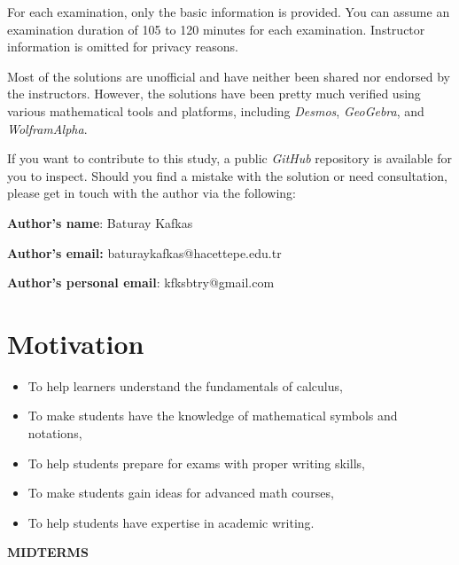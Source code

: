 \documentclass[a4paper, 12pt]{article}
\begin{document}
For each examination, only the basic information is provided. You can assume an examination duration of 105 to 120 minutes for each examination. Instructor information is omitted for privacy reasons.

Most of the solutions are unofficial and have neither been shared nor endorsed by the instructors. However, the solutions have been pretty much verified using various mathematical tools and platforms, including \textit{Desmos}, \textit{GeoGebra}, and \textit{WolframAlpha}.

If you want to contribute to this study, a public \textit{GitHub} repository is available for you to inspect. Should you find a mistake with the solution or need consultation, please get in touch with the author via the following:

\textbf{Author's name}: Baturay Kafkas

\textbf{Author's email:} baturaykafkas@hacettepe.edu.tr

\textbf{Author's personal email}: kfksbtry@gmail.com

\newpage
\section{Motivation}

\begin{itemize}
\item To help learners understand the fundamentals of calculus,
\item To make students have the knowledge of mathematical symbols and notations,
\item To help students prepare for exams with proper writing skills,
\item To make students gain ideas for advanced math courses,
\item To help students have expertise in academic writing.
\end{itemize}

\newpage
{}
\vspace*{\fill}
\begin{center}
{}
\Huge \textbf{MIDTERMS}
\end{center}
\vspace*{\fill}

\newpage
{}
{}
\end{document}
